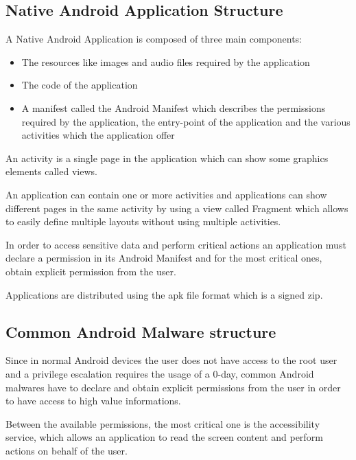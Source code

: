 \subsection{Native Android Application
Structure}\label{native-android-application-structure}

A Native Android Application is composed of three main components:

\begin{itemize}
\tightlist
\item
  The resources like images and audio files required by the application
\item
  The code of the application
\item
  A manifest called the Android Manifest which describes the permissions
  required by the application, the entry-point of the application and
  the various activities which the application offer
\end{itemize}

An activity is a single page in the application which can show some
graphics elements called views.

An application can contain one or more activities and applications can
show different pages in the same activity by using a view called
Fragment which allows to easily define multiple layouts without using
multiple activities.

In order to access sensitive data and perform critical actions an
application must declare a permission in its Android Manifest and for
the most critical ones, obtain explicit permission from the user.

Applications are distributed using the apk file format which is a signed
zip.

\subsection{Common Android Malware
structure}\label{common-android-malware-structure}

Since in normal Android devices the user does not have access to the
root user and a privilege escalation requires the usage of a 0-day,
common Android malwares have to declare and obtain explicit permissions
from the user in order to have access to high value informations.

Between the available permissions, the most critical one is the
accessibility service, which allows an application to read the screen
content and perform actions on behalf of the user.

